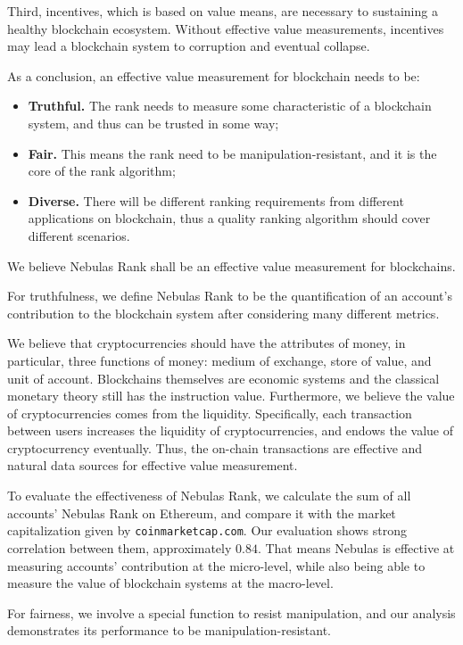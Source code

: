 Third, incentives, which is based on value means, are necessary to sustaining a healthy blockchain ecosystem. Without effective value measurements, incentives may lead a blockchain system to corruption and eventual collapse.

As a conclusion, an effective value measurement for blockchain needs to be:
\begin{itemize}
\item{\textbf{Truthful.}} The rank needs to measure some characteristic of a blockchain system, and thus can be trusted in some way;
\item{\textbf{Fair.}} This means the rank need to be manipulation-resistant, and it is the core of the rank algorithm;
\item{\textbf{Diverse.}} There will be different ranking requirements from different applications on blockchain, thus a quality ranking algorithm should cover different scenarios.
\end{itemize}

We believe Nebulas Rank shall be an effective value measurement for
blockchains.

For truthfulness, we define Nebulas Rank to be the quantification of an account's
contribution to the blockchain system after considering many different
metrics.

We believe that cryptocurrencies should have the attributes of money, in particular, 
three functions of money: medium of exchange, store of value, and unit of
account. Blockchains themselves are economic systems and the classical monetary theory still has the instruction value. Furthermore, we believe the value of cryptocurrencies comes from the liquidity. Specifically, each transaction between users increases the liquidity of cryptocurrencies, and endows the value of cryptocurrency eventually. Thus, the on-chain transactions are effective and natural data sources for effective value measurement.


To evaluate the effectiveness of Nebulas Rank, we calculate the sum of all
accounts' Nebulas Rank on Ethereum, and compare it with the market capitalization
given by \texttt{coinmarketcap.com}. Our evaluation shows strong
correlation between them, approximately $0.84$. That means Nebulas is effective at measuring
accounts' contribution at the micro-level, while also being able to measure the
value of blockchain systems at the macro-level.

For fairness, we involve a special function to resist manipulation, and our analysis demonstrates its performance to be manipulation-resistant.

